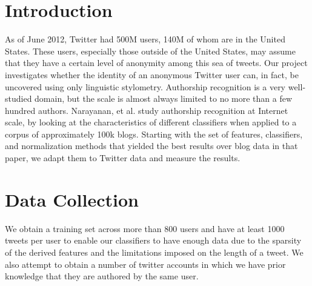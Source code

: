 \documentclass[10pt, conference, compsocconf]{IEEEtran}
\begin{document}




%
\IEEEpeerreviewmaketitle



\section{Introduction}
As of June 2012, Twitter had 500M users, 140M of whom are in the
United States. These users, especially those outside of the United
States, may assume that they have a certain level of anonymity among
this sea of tweets. Our project investigates whether the identity of
an anonymous Twitter user can, in fact, be uncovered using only
linguistic stylometry. Authorship recognition is a very well-studied
domain, but the scale is almost always limited to no more than a few
hundred authors. Narayanan, et al.\cite{Narayanan} study authorship recognition at
Internet scale, by looking at the characteristics of different
classifiers when applied to a corpus of approximately 100k
blogs. Starting with the set of features, classifiers, and
normalization methods that yielded the best results over blog data in
that paper, we adapt them to Twitter data and measure the results.

\section{Data Collection}
We obtain a training set across more than 800  users and
have at least 1000 tweets per user to enable our classifiers to have
enough data due to the sparsity of the derived features and the limitations imposed on the length of a tweet. We also attempt to obtain a number of twitter accounts in which we have prior knowledge that they are authored by the same user.
\end{document}

